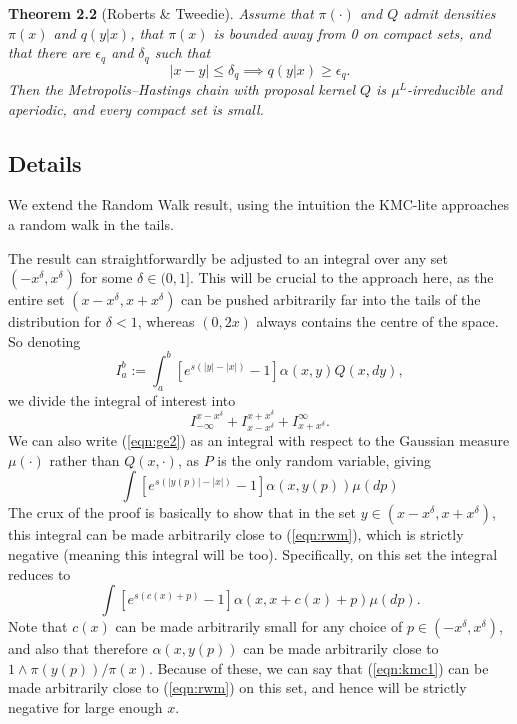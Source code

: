 \documentclass{article}
\begin{document}
\textbf{Theorem 2.2} (Roberts \& Tweedie).  {\itshape Assume that $\pi(\cdot)$ and $Q$ admit densities $\pi(x)$ and $q(y|x)$, that $\pi(x)$ is bounded away from 0 on compact sets, and that there are $\epsilon_q$ and $\delta_q$ such that
\[
|x - y| \leq \delta_q \implies q(y|x) \geq \epsilon_q.
\]
Then the Metropolis--Hastings chain with proposal kernel $Q$ is $\mu^L$-irreducible and aperiodic, and every compact set is small.}

\subsection{Details}

We extend the Random Walk result, using the intuition the KMC-lite approaches a random walk in the tails.

The result can straightforwardly be adjusted to an integral over any set $(-x^\delta,x^{\delta})$ for some $\delta \in (0,1]$.  This will be crucial to the approach here, as the entire set $(x - x^\delta,x + x^\delta)$ can be pushed arbitrarily far into the tails of the distribution for $\delta < 1$, whereas $(0,2x)$ always contains the centre of the space.  So denoting
\[
I_a^b := \int_a^b \left[ e^{s(|y| - |x|)} - 1 \right]\alpha(x,y)Q(x,dy),
\]
we divide the integral of interest into
\[
I_{-\infty}^{x - x^\delta} + I_{x - x^\delta}^{x + x^\delta} + I_{x+x^\delta}^\infty.
\]
We can also write (\ref{eqn:ge2}) as an integral with respect to the Gaussian measure $\mu(\cdot)$ rather than $Q(x,\cdot)$, as $P$ is the only random variable, giving
\[
\int \left[ e^{s(|y(p)| - |x|)} - 1 \right] \alpha(x,y(p)) \mu(dp)
\]
The crux of the proof is basically to show that in the set $y \in (x - x^\delta,x+ x^{\delta})$, this integral can be made arbitrarily close to (\ref{eqn:rwm}), which is strictly negative (meaning this integral will be too).  Specifically, on this set the integral reduces to
\begin{equation} \label{eqn:kmc1}
\int \left[ e^{s(c(x) + p)} - 1 \right] \alpha(x,x + c(x) + p) \mu(dp).
\end{equation}
Note that $c(x)$ can be made arbitrarily small for any choice of $p \in (-x^\delta,x^\delta)$, and also that therefore $\alpha(x,y(p))$ can be made arbitrarily close to $1 \wedge \pi(y(p))/\pi(x)$.  Because of these, we can say that (\ref{eqn:kmc1}) can be made arbitrarily close to (\ref{eqn:rwm}) on this set, and hence will be strictly negative for large enough $x$.
\end{document}
